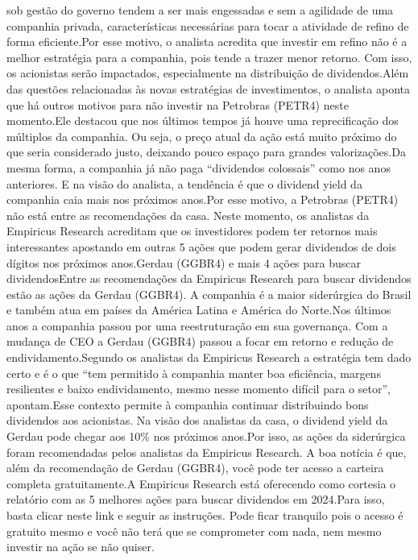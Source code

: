 \documentclass[
   article,       
   12pt,          
   oneside,       
   a4paper,       
   english,       
   brazil,        
   sumario=tradicional
   ]{abntex2}
\begin{document}
sob gestão do governo tendem a ser mais engessadas e sem a agilidade de uma companhia privada, características necessárias para tocar a atividade de refino de forma eficiente.Por esse motivo, o analista acredita que investir em refino não é a melhor estratégia para a companhia, pois tende a trazer menor retorno. Com isso, os acionistas serão impactados, especialmente na distribuição de dividendos.Além das questões relacionadas às novas estratégias de investimentos, o analista aponta que há outros motivos para não investir na Petrobras (PETR4) neste momento.Ele destacou que nos últimos tempos já houve uma reprecificação dos múltiplos da companhia. Ou seja, o preço atual da ação está muito próximo do que seria considerado justo, deixando pouco espaço para grandes valorizações.Da mesma forma, a companhia já não paga “dividendos colossais” como nos anos anteriores. E na visão do analista, a tendência é que o dividend yield da companhia caia mais nos próximos anos.Por esse motivo, a Petrobras (PETR4) não está entre as recomendações da casa. Neste momento, os analistas da Empiricus Research acreditam que os investidores podem ter retornos mais interessantes apostando em outras 5 ações que podem gerar dividendos de dois dígitos nos próximos anos.Gerdau (GGBR4) e mais 4 ações para buscar dividendosEntre as recomendações da Empiricus Research para buscar dividendos estão as ações da Gerdau (GGBR4). A companhia é a maior siderúrgica do Brasil e também atua em países da América Latina e América do Norte.Nos últimos anos a companhia passou por uma reestruturação em sua governança. Com a mudança de CEO a Gerdau (GGBR4) passou a focar em retorno e redução de endividamento.Segundo os analistas da Empiricus Research a estratégia tem dado certo e é o que “tem permitido à companhia manter boa eficiência, margens resilientes e baixo endividamento, mesmo nesse momento difícil para o setor”, apontam.Esse contexto permite à companhia continuar distribuindo bons dividendos aos acionistas. Na visão dos analistas da casa, o dividend yield da Gerdau pode chegar aos 10\% nos próximos anos.Por isso, as ações da siderúrgica foram recomendadas pelos analistas da Empiricus Research. A boa notícia é que, além da recomendação de Gerdau (GGBR4), você pode ter acesso a carteira completa gratuitamente.A Empiricus Research está oferecendo como cortesia o relatório com as 5 melhores ações para buscar dividendos em 2024.Para isso, basta clicar neste link e seguir as instruções. Pode ficar tranquilo pois o acesso é gratuito mesmo e você não terá que se comprometer com nada, nem mesmo investir na ação se não quiser.
\end{document}
